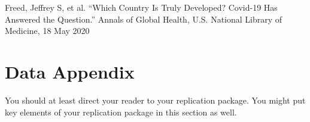\documentclass[12pt]{article}
\begin{document}
Freed, Jeffrey S, et al. “Which Country Is Truly Developed? Covid-19 Has Answered the Question.” Annals of Global Health, U.S. National Library of Medicine, 18 May 2020








\newpage
\section*{Data Appendix} \label{sec:appendixa}


You should at least direct your reader to your replication package. You might put key elements of your replication package in this section as well.
\end{document}
